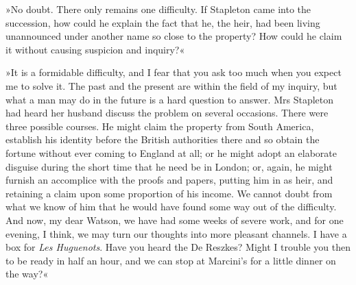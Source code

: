 »No doubt. There only remains one difficulty. If Stapleton came into the succession, how could he explain the fact that he, the heir, had been living unannounced under another name so close to the property? How could he claim it without causing suspicion and inquiry?«


»It is a formidable difficulty, and I fear that you ask too much when you expect me to solve it. The past and the present are within the field of my inquiry, but what a man may do in the future is a hard question to answer. Mrs Stapleton had heard her husband discuss the problem on several occasions. There were three possible courses. He might claim the property from South America, establish his identity before the British authorities there and so obtain the fortune without ever coming to England at all; or he might adopt an elaborate disguise during the short time that he need be in London; or, again, he might furnish an accomplice with the proofs and papers, putting him in as heir, and retaining a claim upon some proportion of his income. We cannot doubt from what we know of him that he would have found some way out of the difficulty. And now, my dear Watson, we have had some weeks of severe work, and for one evening, I think, we may turn our thoughts into more pleasant channels. I have a box for \textit{Les Huguenots}. Have you heard the De Reszkes? Might I trouble you then to be ready in half an hour, and we can stop at Marcini's for a little dinner on the way?«




